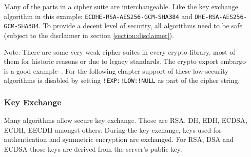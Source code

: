 


Many of the parts in a cipher suite are interchangeable. Like the key exchange
algorithm in this example: \texttt{ECDHE-RSA-AES256-GCM-SHA384} and
\texttt{DHE-RSA-AES256-GCM-SHA384}.  To provide a decent level of security, all
algorithms need to be safe (subject to the disclaimer in section
\ref{section:disclaimer}).

Note: There are some very weak cipher suites in every crypto library, most of
them for historic reasons or due to legacy standards. The crypto export embargo
is a good example~\cite{Wikipedia:ExportCipher}.  For the following chapter
support of these low-security algorithms is disabled by setting
\texttt{!EXP:!LOW:!NULL} as part of the cipher string.


\subsubsection{Key Exchange}

Many algorithms allow secure key exchange.  Those are RSA, DH, EDH, ECDSA,
ECDH, EECDH amongst others. During the key exchange, keys used for authentication
and symmetric encryption are exchanged. For RSA, DSA and ECDSA those keys are derived
from the server's public key.



